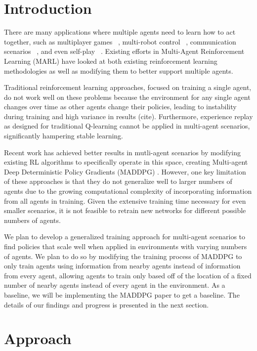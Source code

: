 \documentclass{article}
\begin{document}
\section{Introduction}
\label{submission}

There are many applications where multiple agents need to learn how to act together, such as multiplayer games ~\cite{multigames}, multi-robot control ~\cite{multirobot}, communication scenarios ~\cite{communication}, and even self-play ~\cite{selfplay}. Existing efforts in Multi-Agent Reinforcement Learning (MARL) have looked at both existing reinforcement learning methodologies as well as modifying them to better support multiple agents.

Traditional reinforcement learning approaches, focused on training a single agent, do not work well on these problems because the environment for any single agent changes over time as other agents change their policies, leading to instability during training and high variance in results (cite). Furthermore, experience replay as designed for traditional Q-learning cannot be applied in multi-agent scenarios, significantly hampering stable learning.

Recent work has achieved better results in mutli-agent scenarios by modifying existing RL algorithms to specifically operate in this space, creating Multi-agent Deep Deterministic Policy Gradients (MADDPG) \cite{maddpg}. However, one key limitation of these approaches is that they do not generalize well to larger numbers of agents due to the growing computational complexity of incorporating information from all agents in training. Given the extensive training time necessary for even smaller scenarios, it is not feasible to retrain new networks for different possible numbers of agents.

We plan to develop a generalized training approach for multi-agent scenarios to find policies that scale well when applied in environments with varying numbers of agents. We plan to do so by modifying the training process of MADDPG to only train agents using information from nearby agents instead of information from every agent, allowing agents to train only based off of the location of a fixed number of nearby agents instead of every agent in the environment. As a baseline, we will be implementing the MADDPG \cite{maddpg} paper to get a baseline. The details of our findings and progress is presented in the next section. 

\section{Approach}
\end{document}
